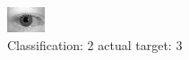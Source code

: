 \begin{figure}[h!]
\begin{center}
\includegraphics[width=0.60\columnwidth]{figures/ID654_class_2_target_3.png}
\end{center}
\caption{ Classification: 2 actual target: 3}
\label{fig:ID654_class_2_target_3}
\end{figure}
